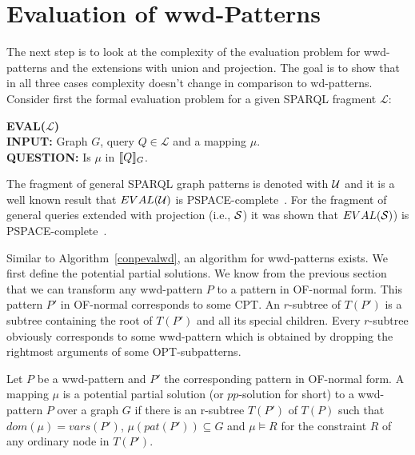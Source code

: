 \section{Evaluation of wwd-Patterns}
The next step is to look at the complexity of the evaluation problem for
wwd-patterns and the extensions with union and projection. The goal is to show
that in all three cases complexity doesn't change in comparison to wd-patterns.
Consider first the formal evaluation problem for a given SPARQL fragment $\mathcal{L}$:
\begin{framed}\noindent \textbf{EVAL($\mathcal{L}$)}\\
	\textbf{INPUT:} Graph $G$, query $Q \in  \mathcal{L}$ and a mapping $\mu$.\\
	\textbf{QUESTION:} Is $\mu$ in $\llbracket Q \rrbracket_G$.
\end{framed}
The fragment of general SPARQL graph patterns is denoted with $\mathcal{U}$ and it is a
well known result that $EVAL(\mathcal{U})$ is PSPACE-complete~\cite{perez2009semantics}.
For the fragment of general queries extended with projection (i.e., $\mathcal{S}$)
it was shown that $EVAL(\mathcal{S})$) is PSPACE-complete~\cite{letelier2013static}.


Similar to Algorithm~\ref{conpevalwd}, an algorithm for wwd-patterns exists. 
We first define the potential partial solutions. 
We know from the previous section that we can transform any wwd-pattern $P$ to a
pattern in OF-normal form. This pattern $P'$ in OF-normal corresponds to some
CPT. An $r$-subtree of $T(P')$ is a subtree containing the root of $T(P')$ and
all its special children. Every $r$-subtree obviously corresponds to some
wwd-pattern which is obtained by dropping the rightmost arguments of some
OPT-subpatterns.

\begin{definition}
	Let $P$ be a wwd-pattern and $P'$ the corresponding pattern in OF-normal
	form.
	A mapping $\mu$ is a potential partial solution (or $pp$-solution for short)
	to a wwd-pattern $P$ over a graph $G$ if there is an r-subtree $T(P')$ of
	$T(P)$ such that $dom(\mu) = vars(P')$, $\mu(pat(P')) \subseteq G$ and $\mu
	\models R$ for the constraint $R$ of any ordinary node in $T(P')$.
\end{definition}

